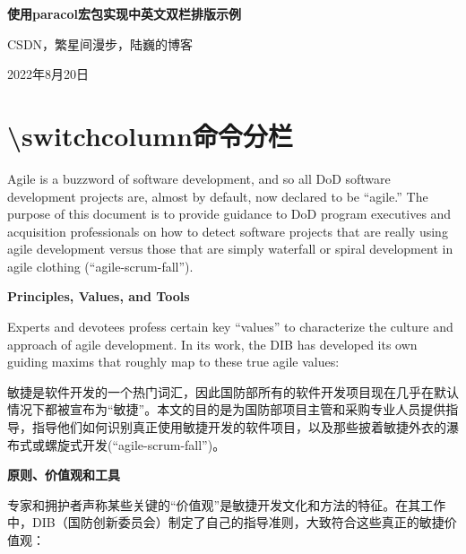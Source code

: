 \documentclass[UTF8, oneside]{ctexbook}
\begin{document}
\begin{titlepage}
  \begin{center}
    \quad

    \vspace{.2\textheight}
    \huge\textbf{使用paracol宏包实现中英文双栏排版示例}

    \vspace{2ex}
    \normalsize CSDN，繁星间漫步，陆巍的博客

    \vfill
    2022年8月20日
  \end{center}
\end{titlepage}

\mainmatter

\section{\textbackslash switchcolumn命令分栏}
\begin{paracol}{2}
  Agile is a buzzword of software development, and so all DoD software development projects are, almost by default, now declared to be “agile.” The purpose of this document is to provide guidance to DoD program executives and acquisition professionals on how to detect software projects that are really using agile development versus those that are simply waterfall or spiral development in agile clothing (“agile-scrum-fall”).
  
  \large\textbf{Principles, Values, and Tools}
  
  Experts and devotees profess certain key “values” to characterize the culture and approach of agile development. In its work, the DIB has developed its own guiding maxims that roughly map to these true agile values:

  \switchcolumn
  敏捷是软件开发的一个热门词汇，因此国防部所有的软件开发项目现在几乎在默认情况下都被宣布为“敏捷”。本文的目的是为国防部项目主管和采购专业人员提供指导，指导他们如何识别真正使用敏捷开发的软件项目，以及那些披着敏捷外衣的瀑布式或螺旋式开发(“agile-scrum-fall”)。

  \large\textbf{原则、价值观和工具}

  专家和拥护者声称某些关键的“价值观”是敏捷开发文化和方法的特征。在其工作中，DIB（国防创新委员会）制定了自己的指导准则，大致符合这些真正的敏捷价值观：
\end{paracol}
\end{document}

